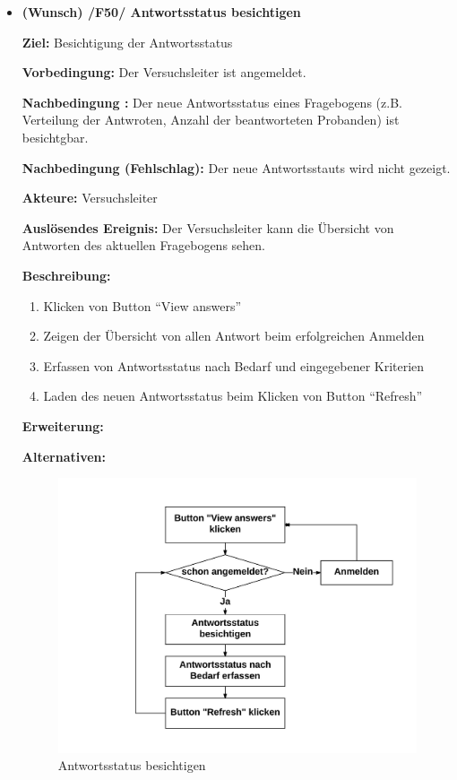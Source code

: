 \documentclass[a4paper]{scrreprt}
\begin{document}
\begin{itemize}
                \item \textbf{(Wunsch) /F50/ \gls{Antwortsstatus} besichtigen}
                \par \textbf{Ziel: }Besichtigung der Antwortsstatus
                \par \textbf{Vorbedingung: }Der \gls{Versuchsleiter} ist angemeldet.
                \par \textbf{Nachbedingung : }Der neue Antwortsstatus eines Fragebogens (z.B. Verteilung der Antwroten, Anzahl der beantworteten \gls{Proband}en) ist besichtgbar.
                \par \textbf{Nachbedingung (Fehlschlag): }Der neue Antwortsstauts wird nicht gezeigt.
                \par \textbf{Akteure: }\gls{Versuchsleiter}
                \par \textbf{Auslösendes Ereignis: }Der \gls{Versuchsleiter} kann die \"Ubersicht von Antworten des aktuellen Fragebogens sehen.
                \par \textbf{Beschreibung: }
                \begin{enumerate}
                    \item Klicken von Button ``View answers''
                    \item Zeigen der \"Ubersicht von allen Antwort beim erfolgreichen Anmelden
                    \item Erfassen von Antwortsstatus nach Bedarf und eingegebener Kriterien
                    \item Laden des neuen Antwortsstatus beim Klicken von Button ``Refresh''
                \end{enumerate}
                \par \textbf{Erweiterung: }
                \par \textbf{Alternativen: }
                \begin{figure}[H]
                    \centering
                    \includegraphics[scale=0.8]{Antwortsstatus_besichtigen.jpeg}
                    \caption{Antwortsstatus besichtigen}
                \end{figure}



\end{itemize}
\end{document}
